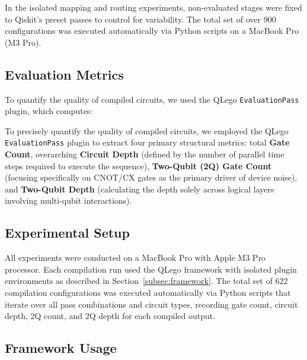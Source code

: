 \documentclass[conference]{IEEEtran}
\begin{document}
In the isolated mapping and routing experiments, non-evaluated stages were fixed to Qiskit's preset passes to control for variability. The total set of over 900 configurations was executed automatically via Python scripts on a MacBook Pro (M3 Pro).

\subsection{Evaluation Metrics}
\label{subsec:metrics}

To quantify the quality of compiled circuits, we used the QLego \texttt{EvaluationPass} plugin, which computes:

To precisely quantify the quality of compiled circuits, we employed the QLego \texttt{EvaluationPass} plugin to extract four primary structural metrics: total \textbf{Gate Count}, overarching \textbf{Circuit Depth} (defined by the number of parallel time steps required to execute the sequence), \textbf{Two-Qubit (2Q) Gate Count} (focusing specifically on CNOT/CX gates as the primary driver of device noise), and \textbf{Two-Qubit Depth} (calculating the depth solely across logical layers involving multi-qubit interactions).

\subsection{Experimental Setup}
\label{subsec:setup}

All experiments were conducted on a MacBook Pro with Apple M3 Pro processor. Each compilation run used the QLego framework with isolated plugin environments as described in Section~\ref{subsec:framework}. The total set of 622 compilation configurations was executed automatically via Python scripts that iterate over all pass combinations and circuit types, recording gate count, circuit depth, 2Q count, and 2Q depth for each compiled output.

\subsection{Framework Usage}
\label{subsec:usage}
\end{document}
